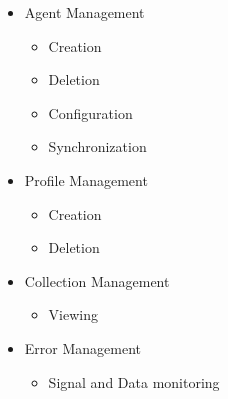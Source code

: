 \documentclass[]{report}
\begin{document}
\begin{itemize}
  \item Agent Management
  \begin{itemize}
    \item Creation
    \item Deletion
    \item Configuration
    \item Synchronization
  \end{itemize}
  \item Profile Management
  \begin{itemize}
    \item Creation
    \item Deletion
  \end{itemize}
  \item Collection Management
  \begin{itemize}
    \item Viewing
  \end{itemize}
  \item Error Management
  \begin{itemize}
    \item Signal and Data monitoring
  \end{itemize}
\end{itemize}
\end{document}
